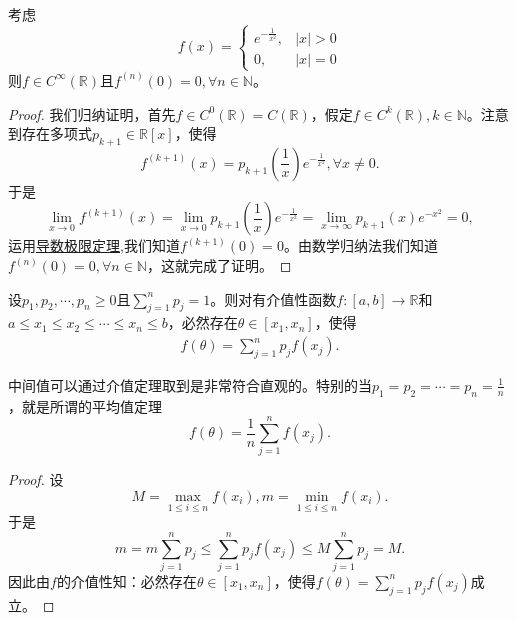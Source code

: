 \documentclass[../../main.tex]{subfiles}
\begin{document}
\begin{example}[\,\,经典光滑函数]\label{example:经典光滑函数}
考虑
\[
f(x)=
\begin{cases}
e^{-\frac{1}{x^2}}, &|x|>0 \\
0, &|x| = 0
\end{cases}
\]
则\(f\in C^{\infty}(\mathbb{R})\)且\(f^{(n)}(0)=0,\forall n\in\mathbb{N}\)。
\end{example}
\begin{proof}
我们归纳证明，首先\(f\in C^{0}(\mathbb{R}) = C(\mathbb{R})\)，假定\(f\in C^{k}(\mathbb{R}),k\in\mathbb{N}\)。注意到存在多项式\(p_{k + 1}\in\mathbb{R}[x]\)，使得
\[
f^{(k + 1)}(x)=p_{k + 1}\left(\frac{1}{x}\right)e^{-\frac{1}{x^2}},\forall x\neq0.
\]
于是
\[
\lim_{x\rightarrow0}f^{(k + 1)}(x)=\lim_{x\rightarrow0}p_{k + 1}\left(\frac{1}{x}\right)e^{-\frac{1}{x^2}}=\lim_{x\rightarrow\infty}p_{k + 1}(x)e^{-x^2}=0,
\]
运用\hyperref[theorem:导数极限定理]{导数极限定理},我们知道\(f^{(k + 1)}(0)=0\)。由数学归纳法我们知道\(f^{(n)}(0)=0,\forall n\in\mathbb{N}\)，这就完成了证明。
\end{proof}

\begin{theorem}[连续函数中间值定理]\label{theorem:连续函数中间值定理}
设\(p_1,p_2,\cdots,p_n\geqslant0\)且\(\sum_{j = 1}^{n}p_j = 1\)。则对有介值性函数\(f:[a,b]\to\mathbb{R}\)和\(a\leqslant x_1\leqslant x_2\leqslant\cdots\leqslant x_n\leqslant b\)，必然存在\(\theta\in[x_1,x_n]\)，使得
\begin{align*}
f(\theta)=\sum_{j = 1}^{n}p_jf(x_j).
\end{align*}
\end{theorem}
\begin{note}
中间值可以通过介值定理取到是非常符合直观的。特别的当\(p_1 = p_2=\cdots=p_n=\frac{1}{n}\)，就是所谓的平均值定理
\[
f(\theta)=\frac{1}{n}\sum_{j = 1}^{n}f(x_j).
\]
\end{note}
\begin{proof}
设
\[
M=\max_{1\leqslant i\leqslant n}f(x_i),m=\min_{1\leqslant i\leqslant n}f(x_i).
\]
于是
\[
m = m\sum_{j = 1}^{n}p_j\leqslant\sum_{j = 1}^{n}p_jf(x_j)\leqslant M\sum_{j = 1}^{n}p_j = M.
\]
因此由\(f\)的介值性知：必然存在\(\theta\in[x_1,x_n]\)，使得$f(\theta)=\sum_{j = 1}^{n}p_jf(x_j)$成立。
\end{proof}
\end{document}

